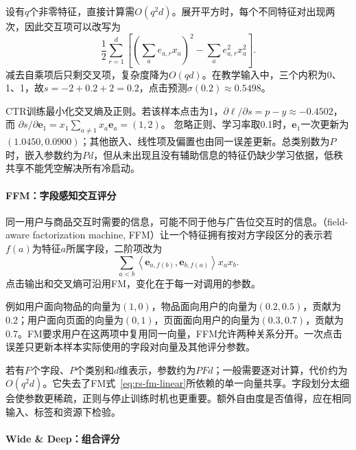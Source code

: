 设有$q$个非零特征，直接计算需$O(q^2d)$。展开平方时，每个不同特征对出现两次，因此交互项可以改写为
\begin{equation}
 \frac12\sum_{r=1}^{d}
 \left[\left(\sum_a e_{a,r}x_a\right)^2
       -\sum_a e_{a,r}^2x_a^2\right].
 \label{eq:rs-fm-linear}
\end{equation}
减去自乘项后只剩交叉项，复杂度降为$O(qd)$。在教学输入中，三个内积为0、1、1，故$s=-2+0.2+2=0.2$，点击预测$\sigma(0.2)\approx0.5498$。

CTR训练最小化交叉熵及正则。若该样本点击为1，$\partial\ell/\partial s=p-y\approx-0.4502$，而
$\partial s/\partial\bm e_1=x_1\sum_{a\ne1}x_a\bm e_a=(1,2)$。
忽略正则、学习率取0.1时，$\bm e_1$一次更新为$(1.0450,0.0900)$；其他嵌入、线性项及偏置也由同一误差更新。总类别数为$P$时，嵌入参数约为$Pd$，但从未出现且没有辅助信息的特征仍缺少学习依据，低秩共享不能凭空解决所有冷启动。

\paragraph{FFM：字段感知交互评分}
\label{sec:rs-ffm}

同一用户与商品交互时需要的信息，可能不同于他与广告位交互时的信息。（field-aware factorization machine, FFM）让一个特征拥有按对方字段区分的表示若$f(a)$为特征$a$所属字段，二阶项改为
\begin{equation}
 \sum_{a<b}
 \left\langle\bm e_{a,f(b)},\bm e_{b,f(a)}\right\rangle x_ax_b.
 \label{eq:rs-ffm}
\end{equation}
点击输出和交叉熵可沿用FM，变化在于每一对调用的参数。

例如用户面向物品的向量为$(1,0)$，物品面向用户的向量为$(0.2,0.5)$，贡献为0.2；用户面向页面的向量为$(0,1)$，页面面向用户的向量为$(0.3,0.7)$，贡献为0.7。FM要求用户在这两项中复用同一向量，FFM允许两种关系分开。一次点击误差只更新本样本实际使用的字段对向量及其他评分参数。

若有$F$个字段、$P$个类别和$d$维表示，参数约为$PFd$；一般需要逐对计算，代价约为$O(q^2d)$。它失去了FM式~\eqref{eq:rs-fm-linear}所依赖的单一向量共享。字段划分太细会使参数更稀疏，正则与停止训练时机也更重要。额外自由度是否值得，应在相同输入、标签和资源下检验。

\paragraph{Wide \& Deep：组合评分}
\label{sec:rs-wide-deep}

